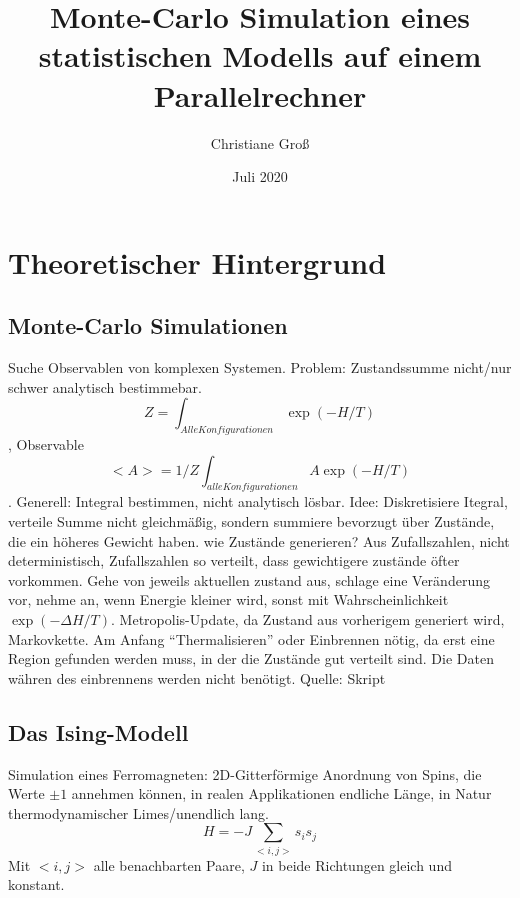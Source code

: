\documentclass{scrreprt}
\title{Monte-Carlo Simulation eines statistischen Modells auf einem Parallelrechner}
\date{Juli 2020}
\author{Christiane Groß}
\begin{document}
	\maketitle
	
	
	\tableofcontents
	
	\clearpage
	
	\chapter{Theoretischer Hintergrund}
	\section{Monte-Carlo Simulationen}
	Suche Observablen von komplexen Systemen. Problem: Zustandssumme nicht/nur schwer analytisch bestimmebar. \[Z=\int_{Alle Konfigurationen}\exp(-H/T)\], Observable \[<A>=1/Z\int_{alle Konfigurationen} A\exp(-H/T)\]. Generell: Integral bestimmen, nicht analytisch lösbar.
	Idee: Diskretisiere Itegral, verteile Summe nicht gleichmäßig, sondern summiere bevorzugt über Zustände, die ein höheres Gewicht haben. 
	wie Zustände generieren? Aus Zufallszahlen, nicht deterministisch, Zufallszahlen so verteilt, dass gewichtigere zustände öfter vorkommen. Gehe von jeweils aktuellen zustand aus, schlage eine Veränderung vor, nehme an, wenn Energie kleiner wird, sonst mit Wahrscheinlichkeit $\exp(-\Delta H/T)$. Metropolis-Update, da Zustand aus vorherigem generiert wird, Markovkette.
	Am Anfang \enquote{Thermalisieren} oder Einbrennen nötig, da erst eine Region gefunden werden muss, in der die Zustände gut verteilt sind. Die Daten währen des einbrennens werden nicht benötigt.
	 Quelle: Skript
	
	\section{Das Ising-Modell}
	Simulation eines Ferromagneten: 2D-Gitterförmige Anordnung von Spins, die Werte $\pm1$ annehmen können, in realen Applikationen endliche Länge, in Natur thermodynamischer Limes/unendlich lang.
	\begin{equation}
	H=-J\sum_{<i,j>}s_is_j
	\label{eq:hamiltonianising}
	\end{equation}
	Mit $<i,j>$ alle benachbarten Paare, $J$ in beide Richtungen gleich und konstant.
	
\end{document}
